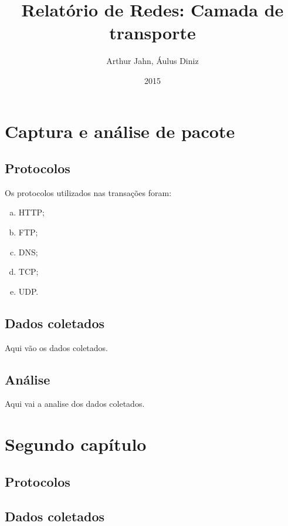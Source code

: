 \documentclass[a4paper]{report} %
\title{Relat\'orio de Redes: Camada de transporte}
\author{Arthur Jahn, \'Aulus Diniz}
\date{2015}    %
\begin{document}
\maketitle  %

\tableofcontents %
\chapter{Captura e an\'alise de pacote}
\label{chap_primeiro} %

\section{Protocolos}
\label{sec_primeiro_protocolos}

Os protocolos utilizados nas transações foram:

\begin{enumerate}[a)]
 \item HTTP;
 \item FTP;
 \item DNS;
 \item TCP;
 \item UDP.
\end{enumerate}

\section{Dados coletados}
\label{sec_primeiro_dados}
Aqui vão os dados coletados.

\section{Análise}
\label{sec_primeiro_analise}
Aqui vai a analise dos dados coletados.

\chapter{Segundo cap\'itulo}
\label{chap_segundo}

\section{Protocolos}
\label{sec_segundo_protocolos}

\section{Dados coletados}
\label{sec_segundo}
\end{document}
